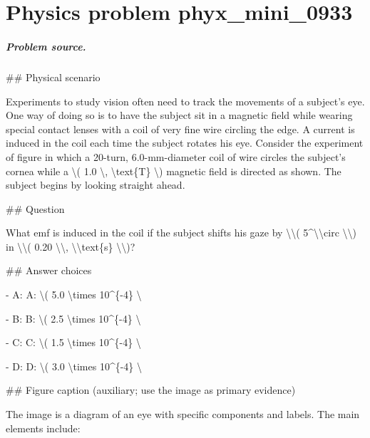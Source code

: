 
\chapter{Physics problem phyx\_mini\_0933}
\label{ch:PhyXMiniProblems_problem_phyx_mini_0933}

\paragraph{Problem source.}
\#\# Physical scenario

Experiments to study vision often need to track the movements of a subject's eye. One way of doing so is to have the subject sit in a magnetic field while wearing special contact lenses with a coil of very fine wire circling the edge. A current is induced in the coil each time the subject rotates his eye. Consider the experiment of figure in which a 20-turn, 6.0-mm-diameter coil of wire circles the subject's cornea while a \textbackslash{}( 1.0 \textbackslash{}, \textbackslash{}text\{T\} \textbackslash{}) magnetic field is directed as shown. The subject begins by looking straight ahead.

\#\# Question

What emf is induced in the coil if the subject shifts his gaze by \textbackslash{}\textbackslash{}( 5\textasciicircum{}\textbackslash{}\textbackslash{}circ \textbackslash{}\textbackslash{}) in \textbackslash{}\textbackslash{}( 0.20 \textbackslash{}\textbackslash{}, \textbackslash{}\textbackslash{}text\{s\} \textbackslash{}\textbackslash{})?

\#\# Answer choices

- A: A: \textbackslash{}( 5.0 \textbackslash{}times 10\textasciicircum{}\{-4\} \textbackslash{}

- B: B: \textbackslash{}( 2.5 \textbackslash{}times 10\textasciicircum{}\{-4\} \textbackslash{}

- C: C: \textbackslash{}( 1.5 \textbackslash{}times 10\textasciicircum{}\{-4\} \textbackslash{}

- D: D: \textbackslash{}( 3.0 \textbackslash{}times 10\textasciicircum{}\{-4\} \textbackslash{}

\#\# Figure caption (auxiliary; use the image as primary evidence)

The image is a diagram of an eye with specific components and labels. The main elements include:

